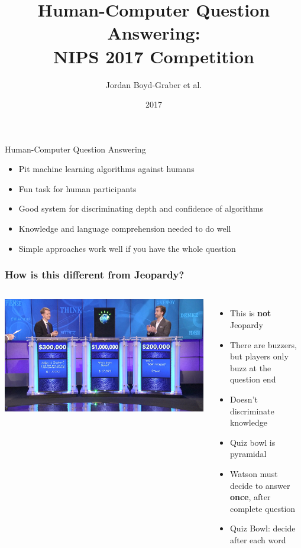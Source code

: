\documentclass[xcolor=dvipsnames]{beamer}
\title[HCQA]{Human-Computer Question Answering: \\ 
NIPS 2017 Competition}
\author{ Jordan Boyd-Graber et al.}
\date{2017}
\institute[Maryland] %
{University of Maryland}
\begin{document}
\frame{
\titlepage
\tiny
}


\begin{frame}{Human-Computer Question Answering}

  \begin{itemize}
    \item Pit machine learning algorithms against humans
    \item Fun task for human participants
    \item Good system for discriminating depth and confidence of
      algorithms
    \item Knowledge and language comprehension needed to do well
    \item Simple approaches work well if you have the whole question
  \end{itemize}

\end{frame}


\begin{frame}
	\frametitle{How is this different from Jeopardy?}

	\begin{columns}

		\includegraphics[width=1.0\linewidth]{qb/jeopardy}


		\begin{itemize}
			\item This is {\bf not} Jeopardy
			\item There are buzzers, but players only buzz
                          at the question end
			\item Doesn't discriminate knowledge
			\item Quiz bowl is pyramidal
                        \item Watson must decide to answer {\bf once}, after
                          complete question
                        \item Quiz Bowl: decide after each word
		\end{itemize}

	\end{columns}

\end{frame}
\end{document}
